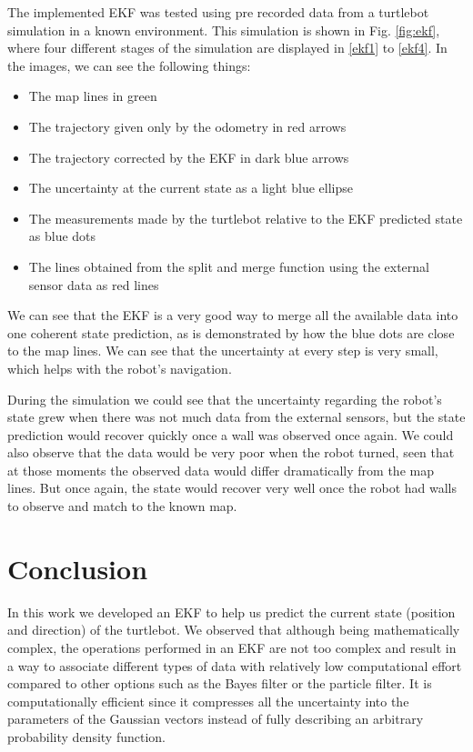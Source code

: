 \documentclass[journal]{IEEEtran}
\begin{document}
The implemented EKF was tested using pre recorded data from a turtlebot simulation in a known environment. This simulation is shown in Fig. \ref{fig:ekf}, where four different stages of the simulation are displayed in \ref{ekf1} to \ref{ekf4}. In the images, we can see the following things:

\begin{itemize}
	\item The map lines in green
	\item The trajectory given only by the odometry in red arrows
	\item The trajectory corrected by the EKF in dark blue arrows 
	\item The uncertainty at the current state as a light blue ellipse
	\item The measurements made by the turtlebot relative to the EKF predicted state as blue dots
	\item The lines obtained from the split and merge function using the external sensor data as red lines
\end{itemize}

We can see that the EKF is a very good way to merge all the available data into one coherent state prediction, as is demonstrated by how the blue dots are close to the map lines. We can see that the uncertainty at every step is very small, which helps with the robot's navigation.

During the simulation we could see that the uncertainty regarding the robot's state grew when there was not much data from the external sensors, but the state prediction would recover quickly once a wall was observed once again. We could also observe that the data would be very poor when the robot turned, seen that at those moments the observed data would differ dramatically from the map lines. But once again, the state would recover very well once the robot had walls to observe and match to the known map.







\section{Conclusion}\label{conclusion}

In this work we developed an EKF to help us predict the current state (position and direction) of the turtlebot. We observed that although being mathematically complex, the operations performed in an EKF are not too complex and result in a way to associate different types of data with relatively low computational effort compared to other options such as the Bayes filter or the particle filter. It is computationally efficient since it compresses all the uncertainty into the parameters of the Gaussian vectors instead of fully describing an arbitrary probability density function.
\end{document}
